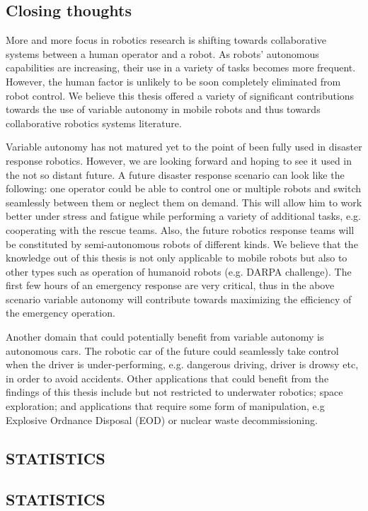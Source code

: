 \documentclass[a4paper,12pt,oneside,openright]{bhamthesis}
\begin{document}
\section{Closing thoughts}
More and more focus in robotics research is shifting towards collaborative systems between a human operator and a robot. As robots' autonomous capabilities are increasing, their use in a variety of tasks becomes more frequent. However, the human factor is unlikely to be soon completely eliminated from robot control. We believe this thesis offered a variety of significant contributions towards the use of variable autonomy in mobile robots and thus towards collaborative robotics systems literature.

Variable autonomy has not matured yet to the point of been fully used in disaster response robotics. However, we are looking forward and hoping to see it used in the not so distant future. A future disaster response scenario can look like the following: one operator could be able to control one or multiple robots and switch seamlessly between them or neglect them on demand. This will allow him to work better under stress and fatigue while performing a variety of additional tasks, e.g. cooperating with the rescue teams. Also, the future robotics response teams will be constituted by semi-autonomous robots of different kinds. We believe that the knowledge out of this thesis is not only applicable to mobile robots but also to other types such as operation of humanoid robots (e.g. DARPA challenge). The first few hours of an emergency response are very critical, thus in the above scenario variable autonomy will contribute towards maximizing the efficiency of the emergency operation.

Another domain that could potentially benefit from variable autonomy is autonomous cars. The robotic car of the future could seamlessly take control when the driver is under-performing, e.g. dangerous driving, driver is drowsy etc, in order to avoid accidents. Other applications that could benefit from the findings of this thesis include but not restricted to underwater robotics; space exploration; and applications that require some form of manipulation, e.g Explosive Ordnance Disposal (EOD) or nuclear waste decommissioning.

\backmatter 





\begin{appendices}
	
\chapter{STATISTICS}

\section{STATISTICS}

\end{appendices}
\end{document}
